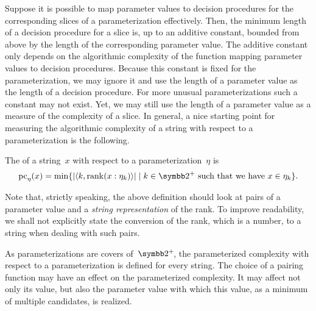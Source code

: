 Suppose it is possible to map parameter values to decision procedures for the corresponding slices of a parameterization effectively.
Then, the minimum length of a decision procedure for a slice is, up to an additive constant, bounded from above by the length of the corresponding parameter value.
The additive constant only depends on the algorithmic complexity of the function mapping parameter values to decision procedures.
Because this constant is fixed for the parameterization, we may ignore it and use the length of a parameter value as the length of a decision procedure.
For more unusual parameterizations such a constant may not exist.
Yet, we may still use the length of a parameter value as a measure of the complexity of a slice.
In general, a nice starting point for measuring the algorithmic complexity of a string with respect to a parameterization is the following.
\begin{definition}
\label{def:pc}%
  The  of a string~$x$ with respect to a parameterization~$\eta$ is
  \begin{equation*}
    \pc_\eta(x) \deq \min\{\length{\pair{k}{\rank(x : \eta_k)}} \st k \in \binary^+\text{ such that we have $x \in \eta_k$}\}.
  \end{equation*}
\end{definition}

Note that, strictly speaking, the above definition should look at pairs of a parameter value and a \emph{string representation} of the rank.
To improve readability, we shall not explicitly state the conversion of the rank, which is a number, to a string when dealing with such pairs.

As parameterizations are covers of~$\binary^+\!$, the parameterized complexity with respect to a parameterization is defined for every string.
The choice of a pairing function may have an effect on the parameterized complexity.
It may affect not only its value, but also the parameter value with which this value, as a minimum of multiple candidates, is realized.

